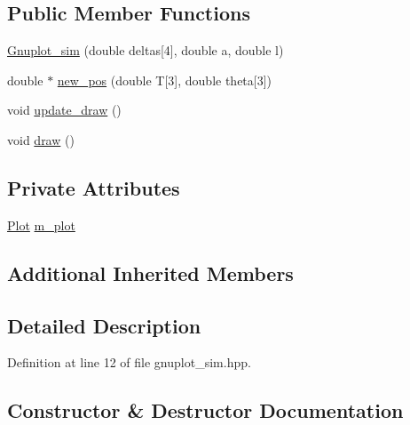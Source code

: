 \subsection*{Public Member Functions}
\begin{DoxyCompactItemize}
\item 
\hyperlink{classstp_1_1_gnuplot__sim_ad53ad8bec757608c339f5af50cdb2a57}{Gnuplot\+\_\+sim} (double deltas\mbox{[}4\mbox{]}, double a, double l)
\item 
double $\ast$ \hyperlink{classstp_1_1_gnuplot__sim_a510b50f1120459f9eb7684f249ed58ca}{new\+\_\+pos} (double T\mbox{[}3\mbox{]}, double theta\mbox{[}3\mbox{]})
\item 
void \hyperlink{classstp_1_1_gnuplot__sim_a22d1793e471b78033080650a3701d2c4}{update\+\_\+draw} ()
\item 
void \hyperlink{classstp_1_1_gnuplot__sim_a7d01da793fef045e81a8927ab7316d61}{draw} ()
\end{DoxyCompactItemize}
\subsection*{Private Attributes}
\begin{DoxyCompactItemize}
\item 
\hyperlink{structstp_1_1_gnuplot__sim_1_1_plot}{Plot} \hyperlink{classstp_1_1_gnuplot__sim_a5a546476a6b62ae119c3ed5da6b0623b}{m\+\_\+plot}
\end{DoxyCompactItemize}
\subsection*{Additional Inherited Members}


\subsection{Detailed Description}


Definition at line 12 of file gnuplot\+\_\+sim.\+hpp.



\subsection{Constructor \& Destructor Documentation}
\mbox{\label{classstp_1_1_gnuplot__sim_ad53ad8bec757608c339f5af50cdb2a57}} 
